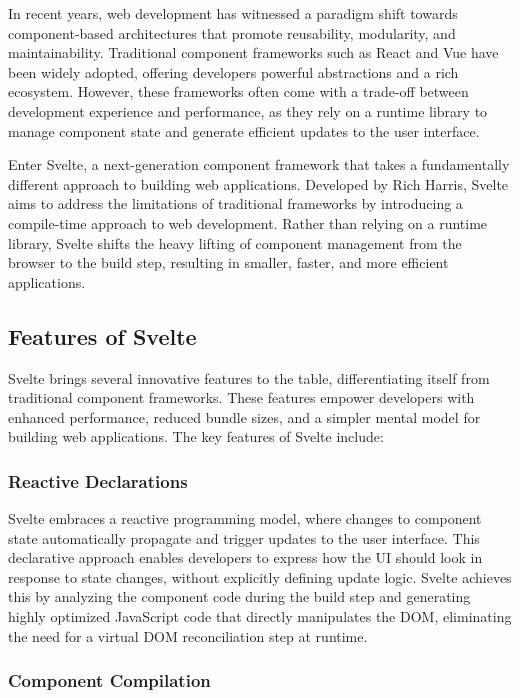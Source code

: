 In recent years, web development has witnessed a paradigm shift towards component-based architectures that promote reusability, modularity, and maintainability. Traditional component frameworks such as React and Vue have been widely adopted, offering developers powerful abstractions and a rich ecosystem. However, these frameworks often come with a trade-off between development experience and performance, as they rely on a runtime library to manage component state and generate efficient updates to the user interface.

Enter Svelte, a next-generation component framework that takes a fundamentally different approach to building web applications. Developed by Rich Harris, Svelte aims to address the limitations of traditional frameworks by introducing a compile-time approach to web development. Rather than relying on a runtime library, Svelte shifts the heavy lifting of component management from the browser to the build step, resulting in smaller, faster, and more efficient applications.

\subsection{Features of Svelte}

Svelte brings several innovative features to the table, differentiating itself from traditional component frameworks. These features empower developers with enhanced performance, reduced bundle sizes, and a simpler mental model for building web applications. The key features of Svelte include:

\subsubsection{Reactive Declarations}

Svelte embraces a reactive programming model, where changes to component state automatically propagate and trigger updates to the user interface. This declarative approach enables developers to express how the UI should look in response to state changes, without explicitly defining update logic. Svelte achieves this by analyzing the component code during the build step and generating highly optimized JavaScript code that directly manipulates the DOM, eliminating the need for a virtual DOM reconciliation step at runtime.

\subsubsection{Component Compilation}

